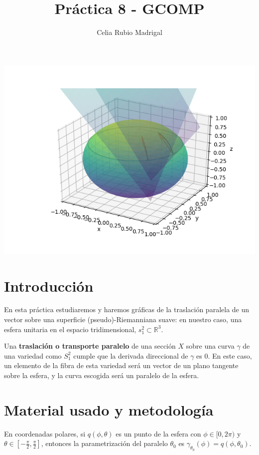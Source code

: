 \documentclass[a4paper]{article}
\author{Celia Rubio Madrigal}
\title{Práctica 8 - GCOMP}
\begin{document}
	\maketitle
	
	\tableofcontents
	
	\vfill
	
	\begin{center}
		\includegraphics[width=0.8\linewidth]{1}
	\end{center}
	
	
	\vfill
	\newpage
	
	\section{Introducción}
	En esta práctica estudiaremos y haremos gráficas de la traslación paralela de un vector sobre una superficie (pseudo)-Riemanniana suave: en nuestro caso, una esfera unitaria en el espacio tridimensional, $s_1^2\subset\mathbb{R}^3$.
	
	Una \textbf{traslación o transporte paralelo} de una sección $X$ sobre una curva $\gamma$ de una variedad como $S_1^2$ cumple que la derivada direccional de $\gamma$ es 0. En este caso, un elemento de la fibra de esta variedad será un vector de un plano tangente sobre la esfera, y la curva escogida será un paralelo de la esfera. 
	
	\section{Material usado y metodología}
	
	En coordenadas polares, si $q(\phi,\theta)$ es un punto de la esfera con $\phi\in[0,2\pi)$ y $\theta\in[-\frac{\pi}{2},\frac{\pi}{2}]$, entonces la parametrización del paralelo $\theta_0$ es $\gamma_{\theta_0}(\phi) = q(\phi,\theta_0)$.
	
\end{document}
